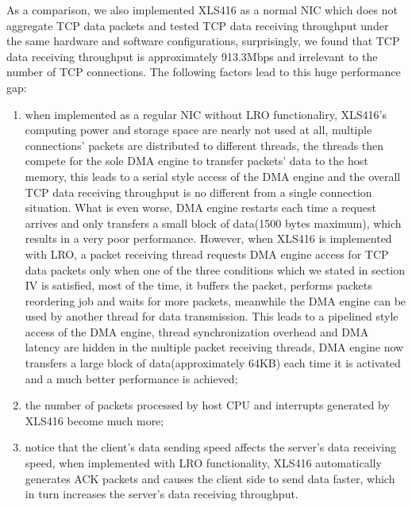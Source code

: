 \documentclass[conference]{IEEEtran}
\begin{document}
As a comparison, we also implemented XLS416 as a normal NIC which does not aggregate TCP data packets and tested TCP data receiving throughput under the same hardware and software configurations, surprisingly, we found that TCP data receiving throughput is approximately 913.3Mbps and irrelevant to the number of TCP connections. The following factors lead to this huge performance gap:
\begin{enumerate}
\item when implemented as a regular NIC without LRO functionaliry, XLS416's computing power and storage space are nearly not used at all, multiple connections' packets are distributed to different threads, the threads then compete for the sole DMA engine to transfer packets' data to the host memory, this leads to a serial style access of the DMA engine and the overall TCP data receiving throughput is no different from a single connection situation. What is even worse, DMA engine restarts each time a request arrives and only transfers a small block of data(1500 bytes maximum), which results in a very poor performance. However, when XLS416 is implemented with LRO, a packet receiving thread requests DMA engine access for TCP data packets only when one of the three conditions which we stated in section IV is satisfied, most of the time, it buffers the packet, performs packets reordering job and waits for more packets, meanwhile the DMA engine can be used by another thread for data transmission. This leads to a pipelined style access of the DMA engine, thread synchronization overhead and DMA latency are hidden in the multiple packet receiving threads, DMA engine now transfers a large block of data(approximately 64KB) each time it is activated and a much better performance is achieved;
\item the number of packets processed by host CPU and interrupts generated by XLS416 become much more;
\item notice that the client's data sending speed affects the server's data receiving speed, when implemented with LRO functionality, XLS416 automatically generates ACK packets and causes the client side to send data faster, which in turn increases the server's data receiving throughput.
\end{enumerate}
\end{document}
